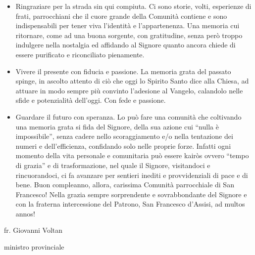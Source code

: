 \begin{itemize}
\renewcommand{\labelitemi}{--}
\item Ringraziare per la strada sin qui compiuta. Ci sono storie, volti, esperienze di frati, 
parrocchiani che il cuore grande della Comunità contiene e sono indispensabili per tener viva 
l’identità e l’appartenenza. Una memoria cui ritornare, come ad una buona sorgente, con 
gratitudine, senza però troppo indulgere nella nostalgia ed affidando al Signore quanto ancora 
chiede di essere purificato e riconciliato pienamente.
\item Vivere il presente con fiducia e passione. La memoria grata del passato spinge, in ascolto 
attento di ciò che oggi lo Spirito Santo dice alla Chiesa, ad attuare in modo sempre più convinto 
l’adesione al Vangelo, calandolo nelle sfide e potenzialità dell’oggi. Con fede e passione.
\item Guardare il futuro con speranza. Lo può fare una comunità che coltivando una memoria 
grata si fida del Signore, della sua azione cui “nulla è impossibile”, senza cadere nello 
scoraggiamento e/o nella tentazione dei numeri e dell’efficienza, confidando solo nelle proprie 
forze. Infatti ogni momento della vita personale e comunitaria può essere kairòs ovvero “tempo di 
grazia” e di trasformazione, nel quale il Signore, visitandoci e rincuorandoci, ci fa avanzare per 
sentieri inediti e provvidenziali di pace e di bene.
\bigbreak
Buon compleanno, allora, carissima Comunità parrocchiale di San Francesco! Nella grazia sempre 
sorprendente e sovrabbondante del Signore e con la fraterna intercessione del Patrono, San 
Francesco d’Assisi,  ad multos annos!
\end{itemize}
\begin{flushright}
fr. Giovanni Voltan\par
ministro provinciale
\end{flushright}
